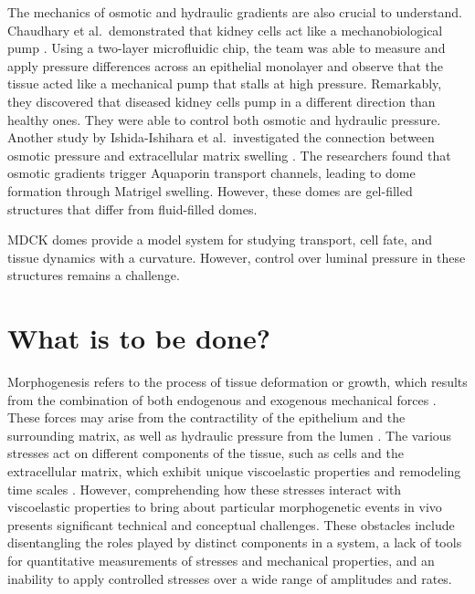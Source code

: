 The mechanics of osmotic and hydraulic gradients are also crucial to understand. Chaudhary et al.~demonstrated that kidney cells act like a mechanobiological pump \cite{choudhury2022}. Using a two-layer microfluidic chip, the team was able to measure and apply pressure differences across an epithelial monolayer and observe that the tissue acted like a mechanical pump that stalls at high pressure. Remarkably, they discovered that diseased kidney cells pump in a different direction than healthy ones. They were able to control both osmotic and hydraulic pressure. Another study by Ishida-Ishihara et al.~investigated the connection between osmotic pressure and extracellular matrix swelling \cite{ishida-ishihara2020}. The researchers found that osmotic gradients trigger Aquaporin transport channels, leading to dome formation through Matrigel swelling. However, these domes are gel-filled structures that  differ from fluid-filled domes.

MDCK domes provide a model system for studying transport, cell fate, and tissue dynamics with a curvature. However, control over luminal pressure in these structures remains a challenge.

\hypertarget{what-is-to-be-done}{%
	\section{What is to be done?}\label{what-is-to-be-done}}

Morphogenesis refers to the process of tissue deformation or growth, which results from the combination of both endogenous and exogenous mechanical forces \cite{valet2022, collinet2021}. These forces may arise from the contractility of the epithelium and the surrounding matrix, as well as hydraulic pressure from the lumen \cite{torres-sanchez2021, chan2020}. The various stresses act on different components of the tissue, such as cells and the extracellular matrix, which exhibit unique viscoelastic properties and remodeling time scales \cite{cavanaugh2020, kelkar2020, ambrosi2019}. However, comprehending how these stresses interact with viscoelastic properties to bring about particular morphogenetic events in vivo presents significant technical and conceptual challenges. These obstacles include disentangling the roles played by distinct components in a system, a lack of tools for quantitative measurements of stresses and mechanical properties, and an inability to apply controlled stresses over a wide range of amplitudes and rates.

